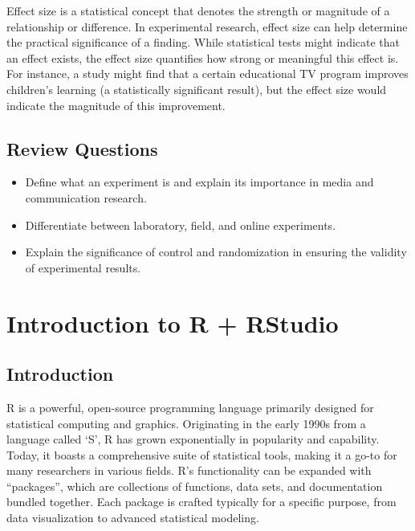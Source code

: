\documentclass[
  b5paper]{book}
\begin{document}
Effect size is a statistical concept that denotes the strength or magnitude of a relationship or difference. In experimental research, effect size can help determine the practical significance of a finding. While statistical tests might indicate that an effect exists, the effect size quantifies how strong or meaningful this effect is. For instance, a study might find that a certain educational TV program improves children's learning (a statistically significant result), but the effect size would indicate the magnitude of this improvement.

\hypertarget{review-questions}{%
\section{Review Questions}\label{review-questions}}

\begin{itemize}
\item
  Define what an experiment is and explain its importance in media and communication research.
\item
  Differentiate between laboratory, field, and online experiments.
\item
  Explain the significance of control and randomization in ensuring the validity of experimental results.
\end{itemize}

\hypertarget{introduction-to-r-rstudio}{%
\chapter{Introduction to R + RStudio}\label{introduction-to-r-rstudio}}

\hypertarget{introduction-5}{%
\section{Introduction}\label{introduction-5}}

R is a powerful, open-source programming language primarily designed for statistical computing and graphics. Originating in the early 1990s from a language called `S', R has grown exponentially in popularity and capability. Today, it boasts a comprehensive suite of statistical tools, making it a go-to for many researchers in various fields. R's functionality can be expanded with ``packages'', which are collections of functions, data sets, and documentation bundled together. Each package is crafted typically for a specific purpose, from data visualization to advanced statistical modeling.
\end{document}

